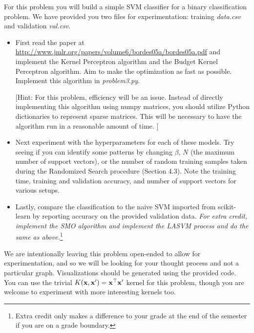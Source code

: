 \documentclass[submit]{harvardml}
\begin{document}
\newpage
\begin{problem}


  For this problem you will build a simple SVM classifier for a binary
  classification problem. We have provided you two files for
  experimentation: training \textit{data.csv} and validation
  \textit{val.csv}.
\begin{itemize}
\item First read the paper at
  \url{http://www.jmlr.org/papers/volume6/bordes05a/bordes05a.pdf} and
  implement the Kernel Perceptron algorithm and the Budget Kernel
  Perceptron algorithm. Aim to make the optimization as fast as possible.
  Implement this algorithm in \textit{problem3.py}.

  [Hint: For this problem, efficiency will be an issue. Instead of directly
implementing this algorithm using numpy matrices, you should utilize
Python dictionaries to represent sparse matrices. This will be necessary 
to have the algorithm run in a reasonable amount of time.   
]
\item Next experiment with the hyperparameters for each of these
  models. Try seeing if you can identify some patterns by changing
  $\beta$, $N$ (the maximum number of support vectors), or the number
  of random training samples taken during the Randomized Search
  procedure (Section 4.3).  Note the training time, training and
  validation accuracy, and number of support vectors for various
  setups.
\item Lastly, compare the classification to the naive SVM imported from
scikit-learn by reporting accuracy on the provided validation
data. {\em For extra credit, implement the SMO algorithm and implement
  the LASVM process and do the same as above.}\footnote{Extra credit
  only makes a difference to your grade at the end of the semester if
  you are on a grade boundary.}

\end{itemize}


We are intentionally leaving this problem open-ended to allow for
experimentation, and so we will be looking for your thought process
and not a particular graph.  Visualizations should be generated 
using the provided code. You can use the trivial
$K(\mathbf{x},\mathbf{x}') = \mathbf{x}^\top \mathbf{x}'$ kernel for this problem,
though you are welcome to experiment with more interesting kernels
too.



\end{problem}
\end{document}
